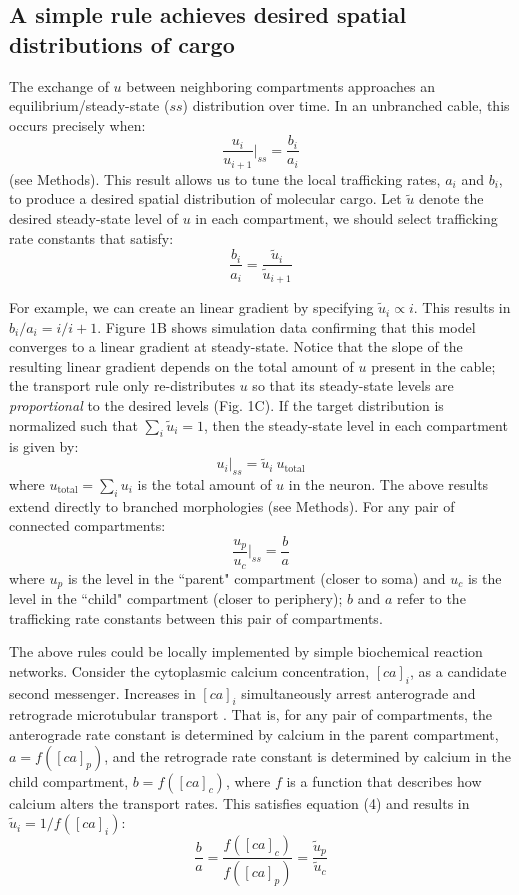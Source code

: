 \documentclass[fleqn,10pt]{wlpeerj}
\begin{document}
\subsection*{A simple rule achieves desired spatial distributions of cargo}

The exchange of $u$ between neighboring compartments approaches an equilibrium/steady-state ($ss$) distribution over time. In an unbranched cable, this occurs precisely when:
$$
\frac{u_i}{u_{i+1}} \Bigg|_{ss} = \frac{b_i}{a_i}
$$
(see Methods). This result allows us to tune the local trafficking rates, $a_i$ and $b_i$, to produce a desired spatial distribution of molecular cargo. Let $\tilde{u}$ denote the desired steady-state level of $u$ in each compartment, we should select trafficking rate constants that satisfy:
$$
\frac{b_i}{a_i} = \frac{\tilde{u}_i}{\tilde{u}_{i+1}}
$$

For example, we can create an linear gradient by specifying $\tilde{u}_i \propto i$. This results in $b_i / a_i =  i / i+1$. Figure 1B shows simulation data confirming that this model converges to a linear gradient at steady-state. Notice that the slope of the resulting linear gradient depends on the total amount of $u$ present in the cable; the transport rule only re-distributes $u$ so that its steady-state levels are \textit{proportional} to the desired levels (Fig. 1C). If the target distribution is normalized such that $\sum_i \tilde{u}_i = 1$, then the steady-state level in each compartment is given by:
$$
u_i \Big|_{ss} = \tilde{u}_i~ u_{\text{total}}
$$
where $u_{\text{total}} = \sum_i u_i$ is the total amount of $u$ in the neuron. The above results extend directly to branched morphologies (see Methods). For any pair of connected compartments:
$$
\frac{u_p}{u_c} \Bigg|_{ss} = \frac{b}{a}
$$
where $u_p$ is the level in the ``parent" compartment (closer to soma) and $u_c$ is the level in the ``child" compartment (closer to periphery); $b$ and $a$ refer to the trafficking rate constants between this pair of compartments.

The above rules could be locally implemented by simple biochemical reaction networks. Consider the cytoplasmic calcium concentration, $[ca]_i$, as a candidate second messenger. Increases in $[ca]_i$ simultaneously arrest anterograde and retrograde microtubular transport \citep{Wang_2009}. That is, for any pair of compartments, the anterograde rate constant is determined by calcium in the parent compartment, $a = f([ca]_p)$,  and the retrograde rate constant is determined by calcium in the child compartment, $b = f([ca]_c)$, where $f$ is a function that describes how calcium alters the transport rates. This satisfies equation (4) and results in $\tilde{u}_i = 1/f([ca]_i)$:
$$
\frac{b}{a} = \frac{f([ca]_c)}{f([ca]_p)} = \frac{\tilde{u}_p}{\tilde{u}_c}
$$
\end{document}
